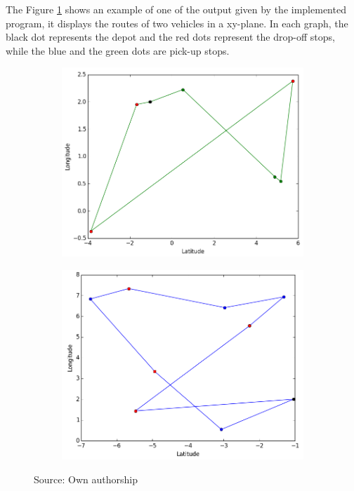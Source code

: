 \documentclass[tuberlin,cic,tc,openright,english,noabntcite,oneside]{iiufrgs}
\begin{document}
The Figure \ref{fig:output} shows an example of one of the output given by the implemented program, it displays the routes of two vehicles in a xy-plane. In each graph, the black dot represents the depot and the red dots represent the drop-off stops, while the blue and the green dots are pick-up stops.
\begin{figure}[H]
	\centering
    \caption{Example of output by the program}
    \begin{subfigure}[b]{0.49\textwidth}
	    \includegraphics[width=\textwidth]{fig_output1}
    \end{subfigure}
    \begin{subfigure}[b]{0.49\textwidth}
	    \includegraphics[width=\textwidth]{fig_output2}
    \end{subfigure}
    \par
	Source: Own authorship
    \label{fig:output}
\end{figure}
\end{document}
